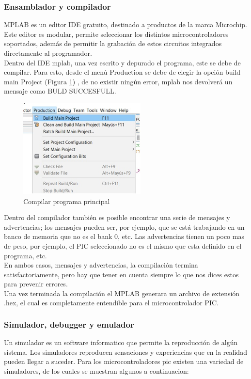 \documentclass[12pt,a4paper]{article}
\begin{document}
   \subsubsection{Ensamblador y compilador}
   MPLAB es un editor IDE gratuito, destinado a productos de la marca Microchip. Este editor es modular, permite seleccionar los distintos microcontroladores soportados, además de permitir la grabación de estos circuitos integrados directamente al programador. \\
   Dentro del IDE mplab, una vez escrito y depurado el programa, este se debe de compilar. Para esto, desde el menú Production se debe de elegir la opción build main Project (Figura \ref{fig:screnMP}) , de no existir ningún error, mplab nos devolverá un mensaje como BULD SUCCESFULL.\\
   
   \begin{figure}
   \centering
   \includegraphics[height=5cm]{screenMPLAB}
   \caption{Compilar programa principal}
   \label{fig:screnMP}
   \end{figure}
   
   Dentro del compilador también es posible encontrar una serie de mensajes y advertencias; los mensajes pueden ser, por ejemplo, que se está trabajando en un banco de memoria que no es el bank 0, etc. Las advertencias tienen un poco mas de peso, por ejemplo, el PIC seleccionado no es el mismo que esta definido en el programa, etc.\\
   En ambos casos, mensajes y advertencias, la compilación termina satisfactoriamente, pero hay que tener en cuenta siempre lo que nos dices estos para prevenir errores.\\
   Una vez terminada la compilación el MPLAB generara un archivo de extensión .hex, el cual es completamente entendible para el microcontrolador PIC.
   
   \subsubsection{Simulador, debugger y emulador}
   Un simulador es un software informatico que permite la reproducción de algún sistema. Los simuladores reproducen sensaciones y experiencias que en la realidad pueden llegar a suceder. Para los microcontroladores pic existen una variedad de simuladores, de los cuales se muestran algunos a continuacion:\\
   
\end{document}
